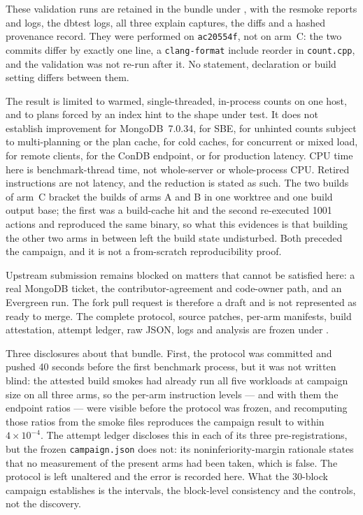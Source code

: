 \documentclass[10pt]{article}
\newcommand{\code}[1]{\texttt{#1}}
\begin{document}
These validation runs are retained in the bundle under , with
the resmoke reports and logs, the dbtest logs, all three explain captures, the diffs
and a hashed provenance record. They were performed on \code{ac20554f}, not on
arm~C: the two commits differ by exactly one line, a \code{clang-format} include
reorder in \code{count.cpp}, and the validation was not re-run after it. No
statement, declaration or build setting differs between them.

The result is limited to warmed, single-threaded, in-process counts on one host,
and to plans forced by an index hint to the shape under test. It does not
establish improvement for MongoDB~7.0.34, for SBE, for unhinted counts subject
to multi-planning or the plan cache, for cold caches, for concurrent or mixed
load, for remote clients, for the ConDB endpoint, or for production latency. CPU
time here is benchmark-thread time, not whole-server or whole-process CPU.
Retired instructions are not latency, and the reduction is stated as such. The
two builds of arm~C bracket the builds of arms A and B in one worktree and one
build output base; the first was a build-cache hit and the second re-executed
1001 actions and reproduced the same binary, so what this evidences is that
building the other two arms in between left the build state undisturbed. Both
preceded the campaign, and it is not a from-scratch reproducibility proof.

Upstream submission remains blocked on matters that cannot be satisfied here: a
real MongoDB ticket, the contributor-agreement and code-owner path, and an
Evergreen run. The fork pull request is therefore a draft and is not represented
as ready to merge. The complete protocol, source patches, per-arm manifests,
build attestation, attempt ledger, raw JSON, logs and analysis are frozen under
.

Three disclosures about that bundle. First, the protocol was committed and pushed
40 seconds before the first benchmark process, but it was not written blind: the
attested build smokes had already run all five workloads at campaign size on all
three arms, so the per-arm instruction levels --- and with them the endpoint
ratios --- were visible before the protocol was frozen, and recomputing those
ratios from the smoke files reproduces the campaign result to within
$4\times10^{-4}$. The attempt ledger discloses this in each of its three
pre-registrations, but the frozen \code{campaign.json} does not: its
noninferiority-margin rationale states that no measurement of the present arms
had been taken, which is false. The protocol is left unaltered and the error is
recorded here. What the 30-block campaign establishes is the intervals, the
block-level consistency and the controls, not the discovery.
\end{document}
